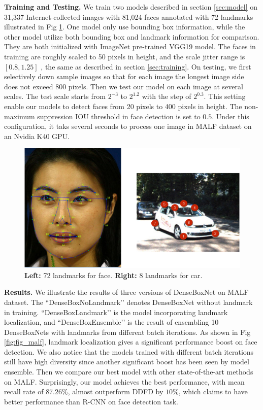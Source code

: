 \textbf{Training and Testing.} We train two models described in section \ref{sec:model} on 31,337 Internet-collected  images with  81,024 faces annotated with 72 landmarks illustrated in Fig \ref{fig:fig_landmark}. One model only use bounding box information, while the other model utilize both bounding box and landmark information for comparison. They are both initialized with ImageNet pre-trained VGG19 model.  The faces in training are roughly scaled to 50 pixels in height, and the scale jitter range is $[0.8,1.25]$ , the same as described in section \ref{sec:training}.  On testing, we first selectively down sample images so that for each image the longest image side does not exceed 800 pixels.  Then we test our model on each image at several scales.  The test scale starts from $2^{-3}$ to $2^{1.2}$ with the step of $2^{0.3}$. This setting enable our models to detect faces from 20 pixels to 400 pixels in height. The non-maximum suppression IOU threshold in face detection is set to $0.5$.  Under this configuration, it taks several seconds to process one image in MALF dataset on an Nvidia K40 GPU. 
	\begin{figure} 
	\centering
	 \includegraphics[scale=0.45]{figures/figure_landmark-crop.pdf}
	\caption{\textbf{Left: } 72 landmarks for face. \textbf{Right: } 8 landmarks for car. }
	\label{fig:fig_landmark}
	\end{figure}
\textbf{Results.} 
We illustrate the results of three versions of DenseBoxNet on MALF dataset. The ``DenseBoxNoLandmark’’ denotes DenseBoxNet without landmark in training. ``DenseBoxLandmark’’ is the model incorporating landmark localization, and ``DenseBoxEnsemble’’ is the result of ensembling 10 DenseBoxNets with landmarks from different batch iterations. As shown in Fig \ref{fig:fig_malf}, landmark localization gives a significant performance boost on face detection.  We also notice that the models trained with different batch iterations still have high diversity since another significant boost has been seen by model ensemble. Then we compare our best model with other state-of-the-art methods on MALF. Surprisingly, our model achieves the best performance, with mean recall rate of $87.26\%$, almost outperform DDFD by $10\%$, which claims to have better performance than R-CNN on face detection task. 
 
